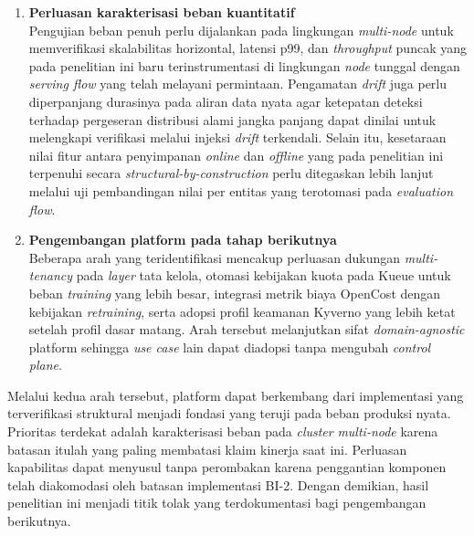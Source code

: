 \begin{enumerate}
  \item \textbf{Perluasan karakterisasi beban kuantitatif} \\
  Pengujian beban penuh perlu dijalankan pada lingkungan \textit{multi-node} untuk memverifikasi skalabilitas horizontal, latensi p99, dan \textit{throughput} puncak yang pada penelitian ini baru terinstrumentasi di lingkungan \textit{node} tunggal dengan \textit{serving flow} yang telah melayani permintaan. Pengamatan \textit{drift} juga perlu diperpanjang durasinya pada aliran data nyata agar ketepatan deteksi terhadap pergeseran distribusi alami jangka panjang dapat dinilai untuk melengkapi verifikasi melalui injeksi \textit{drift} terkendali. Selain itu, kesetaraan nilai fitur antara penyimpanan \textit{online} dan \textit{offline} yang pada penelitian ini terpenuhi secara \textit{structural-by-construction} perlu ditegaskan lebih lanjut melalui uji pembandingan nilai per entitas yang terotomasi pada \textit{evaluation flow}.
  \item \textbf{Pengembangan platform pada tahap berikutnya} \\
  Beberapa arah yang teridentifikasi mencakup perluasan dukungan \textit{multi-tenancy} pada \textit{layer} tata kelola, otomasi kebijakan kuota pada Kueue untuk beban \textit{training} yang lebih besar, integrasi metrik biaya OpenCost dengan kebijakan \textit{retraining}, serta adopsi profil keamanan Kyverno yang lebih ketat setelah profil dasar matang. Arah tersebut melanjutkan sifat \textit{domain-agnostic} platform sehingga \textit{use case} lain dapat diadopsi tanpa mengubah \textit{control plane}.
\end{enumerate}

Melalui kedua arah tersebut, platform dapat berkembang dari implementasi yang terverifikasi struktural menjadi fondasi yang teruji pada beban produksi nyata. Prioritas terdekat adalah karakterisasi beban pada \textit{cluster} \textit{multi-node} karena batasan itulah yang paling membatasi klaim kinerja saat ini. Perluasan kapabilitas dapat menyusul tanpa perombakan karena penggantian komponen telah diakomodasi oleh batasan implementasi BI-2. Dengan demikian, hasil penelitian ini menjadi titik tolak yang terdokumentasi bagi pengembangan berikutnya.
